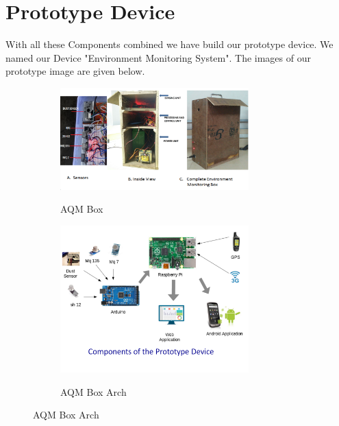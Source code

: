 \section {Prototype Device}
\vspace{0.2in}
With all these Components combined we have build our prototype device. We named our Device "Environment Monitoring System". The images of our prototype image are given below.
\begin{figure}[!htpb]

\begin{subfigure}
\centering
\includegraphics[width=0.8\textwidth]{./prototype_final}\\[0.1in]
\label{fig: Air Quality Monitoring Box}
\caption{AQM Box}
\end{subfigure}

\begin{subfigure}
\centering
\includegraphics[width=0.8\textwidth]{./prototype_arch}\\[0.1in]
\label{fig: Air Quality Monitoring Box Architecture}
\caption{AQM Box Arch}
\end{subfigure}

\end{figure}